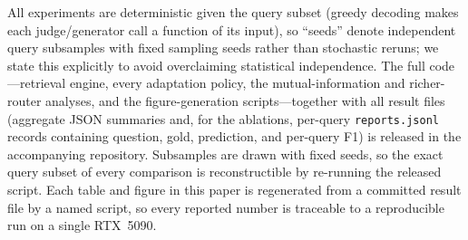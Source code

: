 All experiments are deterministic given the query subset (greedy decoding makes each judge/generator call a function of its input), so ``seeds'' denote independent query subsamples with fixed sampling seeds rather than stochastic reruns; we state this explicitly to avoid overclaiming statistical independence. The full code---retrieval engine, every adaptation policy, the mutual-information and richer-router analyses, and the figure-generation scripts---together with all result files (aggregate JSON summaries and, for the ablations, per-query \texttt{reports.jsonl} records containing question, gold, prediction, and per-query F1) is released in the accompanying repository. Subsamples are drawn with fixed seeds, so the exact query subset of every comparison is reconstructible by re-running the released script. Each table and figure in this paper is regenerated from a committed result file by a named script, so every reported number is traceable to a reproducible run on a single RTX~5090.
